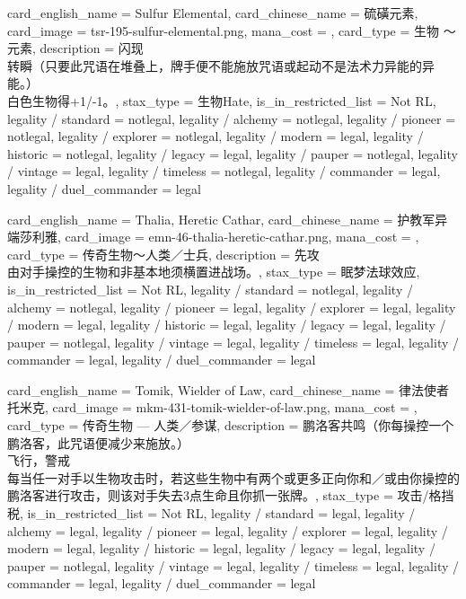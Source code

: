 \documentclass[lang = cn, color = black, 10pt]{AllThatStax}
\begin{document}
\card
{
	card_english_name = {Sulfur Elemental},
	card_chinese_name = {硫磺元素},
	card_image = tsr-195-sulfur-elemental.png,
	mana_cost = ,
	card_type = 生物 ～元素,
	description = {闪现\\
		转瞬（只要此咒语在堆叠上，牌手便不能施放咒语或起动不是法术力异能的异能。）\\
		白色生物得+1/-1。},
	stax_type = 生物Hate,
	is_in_restricted_list = Not RL,
	legality / standard = notlegal,
	legality / alchemy = notlegal,
	legality / pioneer = notlegal,
	legality / explorer = notlegal,
	legality / modern = legal,
	legality / historic = notlegal,
	legality / legacy = legal,
	legality / pauper = notlegal,
	legality / vintage = legal,
	legality / timeless = notlegal,
	legality / commander = legal,
	legality / duel_commander = legal
}

\card
{
	card_english_name = {Thalia, Heretic Cathar},
	card_chinese_name = {护教军异端莎利雅},
	card_image = emn-46-thalia-heretic-cathar.png,
	mana_cost = ,
	card_type = 传奇生物～人类／士兵,
	description = {先攻\\
		由对手操控的生物和非基本地须横置进战场。},
	stax_type = 眠梦法球效应,
	is_in_restricted_list = Not RL,
	legality / standard = notlegal,
	legality / alchemy = notlegal,
	legality / pioneer = legal,
	legality / explorer = legal,
	legality / modern = legal,
	legality / historic = legal,
	legality / legacy = legal,
	legality / pauper = notlegal,
	legality / vintage = legal,
	legality / timeless = legal,
	legality / commander = legal,
	legality / duel_commander = legal
}

\card
{
	card_english_name = {Tomik, Wielder of Law},
	card_chinese_name = {律法使者托米克},
	card_image = mkm-431-tomik-wielder-of-law.png,
	mana_cost = ,
	card_type = 传奇生物 — 人类／参谋,
	description = {鹏洛客共鸣（你每操控一个鹏洛客，此咒语便减少来施放。）\\
		飞行，警戒\\
		每当任一对手以生物攻击时，若这些生物中有两个或更多正向你和／或由你操控的鹏洛客进行攻击，则该对手失去3点生命且你抓一张牌。},
	stax_type = 攻击/格挡税,
	is_in_restricted_list = Not RL,
	legality / standard = legal,
	legality / alchemy = legal,
	legality / pioneer = legal,
	legality / explorer = legal,
	legality / modern = legal,
	legality / historic = legal,
	legality / legacy = legal,
	legality / pauper = notlegal,
	legality / vintage = legal,
	legality / timeless = legal,
	legality / commander = legal,
	legality / duel_commander = legal
}
\end{document}

